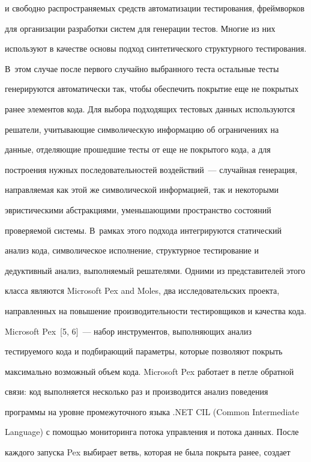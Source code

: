 и свободно распространяемых средств автоматизации тестирования, фреймворков


для организации разработки систем для генерации тестов. Многие из них


используют в качестве основы подход синтетического структурного тестирования.


В~этом случае после первого случайно выбранного теста остальные тесты


генерируются автоматически так, чтобы обеспечить покрытие еще не покрытых


ранее элементов кода. Для выбора подходящих тестовых данных используются


решатели, учитывающие символическую информацию об ограничениях на


данные, отделяющие прошедшие тесты от еще не покрытого кода, а для


построения нужных последовательностей воздействий~--- случайная генерация,


направляемая как этой же символической информацией, так и некоторыми


эвристическими абстракциями, уменьшающими пространство состояний


проверяемой системы. В~рамках этого подхода интегрируются статический


анализ кода, символическое исполнение, структурное тестирование и


дедуктивный анализ, выполняемый решателями. Одними из представителей этого


класса являются Microsoft Pex and Moles, два исследовательских проекта,


направленных на повышение производительности тестировщиков и качества кода.





     Microsoft Pex~[5, 6]~--- набор инструментов, выполняющих анализ


тести\-ру\-емо\-го кода и подбирающий параметры, которые позволяют покрыть


максимально возможный объем кода. Microsoft Pex работает в петле обратной


связи: код выполняется несколько раз и производится анализ поведения


программы на уровне промежуточного языка .NET CIL (Common Intermediate


Language) с помощью мониторинга потока управления и потока данных. После


каждого запуска Pex выбирает ветвь, которая не была покрыта ранее, создает


